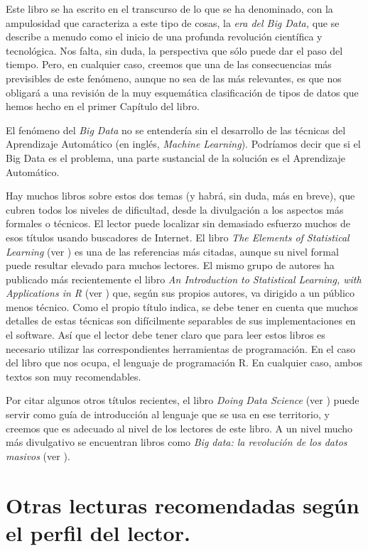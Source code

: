 Este libro se ha escrito en el transcurso de lo que se ha denominado, con la ampulosidad que caracteriza a este tipo de cosas, la  {\em era del Big Data,} que se describe a menudo como el inicio de una profunda revolución científica y tecnológica. Nos falta, sin duda, la perspectiva que sólo puede dar el paso del tiempo.  Pero, en cualquier caso, creemos que una de las consecuencias más previsibles de este fenómeno, aunque no  sea de las más relevantes, es que nos obligará a una revisión de la muy esquemática clasificación de tipos de datos que hemos hecho en el primer Capítulo del libro.

El fenómeno del {\em Big Data} no se entendería sin el desarrollo de las técnicas del Aprendizaje Automático (en inglés, {\em Machine Learning}). Podríamos decir que si el Big Data es el problema, una parte sustancial de la solución es el Aprendizaje Automático.

Hay  muchos libros sobre estos dos temas (y habrá, sin duda, más en breve), que cubren todos los niveles de dificultad, desde la divulgación a los aspectos más formales o técnicos. El lector puede localizar sin demasiado esfuerzo muchos de esos títulos usando buscadores de Internet. El libro {\em The Elements of Statistical Learning} (ver \cite{trevor2009elements}) es una de las referencias más citadas, aunque su nivel formal puede resultar elevado para muchos lectores. El mismo grupo de autores ha publicado más recientemente el libro {\em An Introduction to Statistical Learning, with Applications in R} (ver \cite{james2013introduction}) que, según sus propios autores, va dirigido a un público menos técnico. Como el propio título indica, se debe tener en cuenta que muchos detalles de estas técnicas son difícilmente separables de sus implementaciones en el software. Así que el lector debe tener claro que para leer estos libros es necesario utilizar las correspondientes herramientas de programación. En el caso del libro que nos ocupa, el lenguaje de programación R. En cualquier caso, ambos textos son muy recomendables.

Por citar algunos otros títulos recientes, el libro {\em Doing Data Science} (ver \cite{schutt2013doing}) puede servir como guía de introducción al lenguaje que se usa en ese territorio, y creemos que es adecuado al nivel de los lectores de este libro. A un nivel mucho más divulgativo se encuentran libros como {\em Big data: la revoluci{\'o}n de los datos masivos} (ver \cite{schonberger2013big}).


\section{Otras lecturas recomendadas según el  perfil del lector.}

